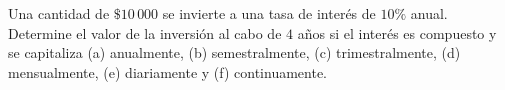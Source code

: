 \item Una cantidad de $\$10\,000$ se invierte a una tasa de interés de $10\%$ anual. Determine el valor de la inversión al cabo de $4$ años si el interés es compuesto y se capitaliza (a) anualmente, (b) semestralmente, (c) trimestralmente, (d) mensualmente, (e) diariamente y (f) continuamente.
